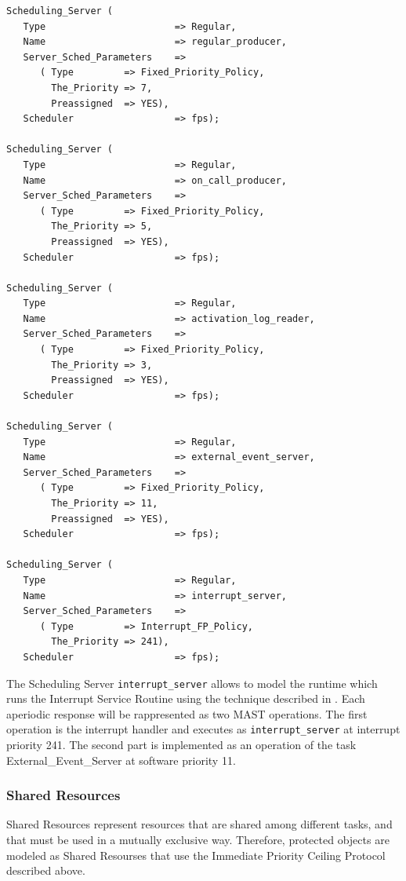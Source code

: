 \documentclass{article}
\begin{document}
\begin{lstlisting}
Scheduling_Server (
   Type                       => Regular,
   Name                       => regular_producer,
   Server_Sched_Parameters    =>
      ( Type         => Fixed_Priority_Policy,
        The_Priority => 7,
        Preassigned  => YES),
   Scheduler                  => fps);

Scheduling_Server (
   Type                       => Regular,
   Name                       => on_call_producer,
   Server_Sched_Parameters    =>
      ( Type         => Fixed_Priority_Policy,
        The_Priority => 5,
        Preassigned  => YES),
   Scheduler                  => fps);

Scheduling_Server (
   Type                       => Regular,
   Name                       => activation_log_reader,
   Server_Sched_Parameters    =>
      ( Type         => Fixed_Priority_Policy,
        The_Priority => 3,
        Preassigned  => YES),
   Scheduler                  => fps);

Scheduling_Server (
   Type                       => Regular,
   Name                       => external_event_server,
   Server_Sched_Parameters    =>
      ( Type         => Fixed_Priority_Policy,
        The_Priority => 11,
        Preassigned  => YES),
   Scheduler                  => fps);

Scheduling_Server (
   Type                       => Regular,
   Name                       => interrupt_server,
   Server_Sched_Parameters    =>
      ( Type         => Interrupt_FP_Policy,
        The_Priority => 241),
   Scheduler                  => fps);
\end{lstlisting}

The Scheduling Server \texttt{interrupt\_server} allows to model the runtime which runs the Interrupt Service Routine using the technique described in \cite{interrupt-handler}. Each aperiodic response will be rappresented as two MAST operations. The first operation is the interrupt handler and executes as \texttt{interrupt\_server} at interrupt priority 241. The second part is implemented as an operation of the task External\_Event\_Server at software priority 11.

\subsubsection{Shared Resources}

Shared Resources represent resources that are shared among different tasks, and that must be used in a mutually exclusive way. Therefore, protected objects are modeled as Shared Resourses that use the Immediate Priority Ceiling Protocol described above.
\end{document}
